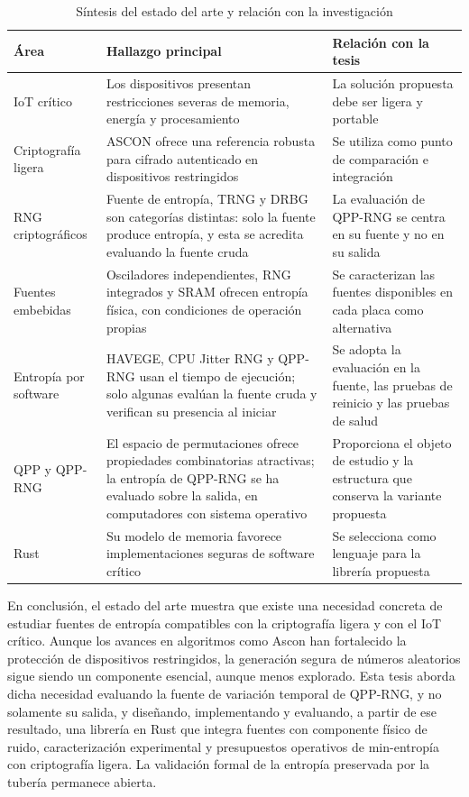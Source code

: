 \begin{table}[htbp]
\centering
\caption{Síntesis del estado del arte y relación con la investigación}
\label{tab:sintesis_estado_arte}
\begin{tabularx}{\textwidth}{@{}p{}p{}X@{}}
\toprule
\textbf{Área} & \textbf{Hallazgo principal} & \textbf{Relación con la tesis} \\
\midrule
IoT crítico & Los dispositivos presentan restricciones severas de memoria, energía y procesamiento & La solución propuesta debe ser ligera y portable \\
Criptografía ligera & ASCON ofrece una referencia robusta para cifrado autenticado en dispositivos restringidos & Se utiliza como punto de comparación e integración \\
RNG criptográficos & Fuente de entropía, TRNG y DRBG son categorías distintas: solo la fuente produce entropía, y esta se acredita evaluando la fuente cruda & La evaluación de QPP-RNG se centra en su fuente y no en su salida \\
Fuentes embebidas & Osciladores independientes, RNG integrados y SRAM ofrecen entropía física, con condiciones de operación propias & Se caracterizan las fuentes disponibles en cada placa como alternativa \\
Entropía por software & HAVEGE, CPU Jitter RNG y QPP-RNG usan el tiempo de ejecución; solo algunas evalúan la fuente cruda y verifican su presencia al iniciar & Se adopta la evaluación en la fuente, las pruebas de reinicio y las pruebas de salud \\
QPP y QPP-RNG & El espacio de permutaciones ofrece propiedades combinatorias atractivas; la entropía de QPP-RNG se ha evaluado sobre la salida, en computadores con sistema operativo & Proporciona el objeto de estudio y la estructura que conserva la variante propuesta \\
Rust & Su modelo de memoria favorece implementaciones seguras de software crítico & Se selecciona como lenguaje para la librería propuesta \\
\bottomrule
\end{tabularx}
\end{table}

En conclusión, el estado del arte muestra que existe una necesidad concreta de estudiar fuentes de entropía compatibles con la criptografía ligera y con el IoT crítico. Aunque los avances en algoritmos como Ascon han fortalecido la protección de dispositivos restringidos, la generación segura de números aleatorios sigue siendo un componente esencial, aunque menos explorado. Esta tesis aborda dicha necesidad evaluando la fuente de variación temporal de QPP-RNG, y no solamente su salida, y diseñando, implementando y evaluando, a partir de ese resultado, una librería en Rust que integra fuentes con componente físico de ruido, caracterización experimental y presupuestos operativos de min-entropía con criptografía ligera. La validación formal de la entropía preservada por la tubería permanece abierta.
